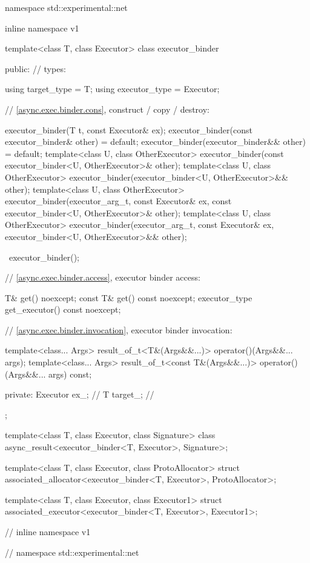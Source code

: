 \begin{codeblock}
namespace std::experimental::net {
inline namespace v1 {

  template<class T, class Executor>
  class executor_binder
  {
  public:
    // types:

    using target_type = T;
    using executor_type = Executor;

    // \ref{async.exec.binder.cons}, construct / copy / destroy:

    executor_binder(T t, const Executor& ex);
    executor_binder(const executor_binder& other) = default;
    executor_binder(executor_binder&& other) = default;
    template<class U, class OtherExecutor>
      executor_binder(const executor_binder<U, OtherExecutor>& other);
    template<class U, class OtherExecutor>
      executor_binder(executor_binder<U, OtherExecutor>&& other);
    template<class U, class OtherExecutor>
      executor_binder(executor_arg_t, const Executor& ex,
        const executor_binder<U, OtherExecutor>& other);
    template<class U, class OtherExecutor>
      executor_binder(executor_arg_t, const Executor& ex,
        executor_binder<U, OtherExecutor>&& other);

    ~executor_binder();

    // \ref{async.exec.binder.access}, executor binder access:

    T& get() noexcept;
    const T& get() const noexcept;
    executor_type get_executor() const noexcept;

    // \ref{async.exec.binder.invocation}, executor binder invocation:

    template<class... Args>
      result_of_t<T&(Args&&...)> operator()(Args&&... args);
    template<class... Args>
      result_of_t<const T&(Args&&...)> operator()(Args&&... args) const;

  private:
    Executor ex_; // \expos
    T target_; // \expos
  };

  template<class T, class Executor, class Signature>
    class async_result<executor_binder<T, Executor>, Signature>;

  template<class T, class Executor, class ProtoAllocator>
    struct associated_allocator<executor_binder<T, Executor>, ProtoAllocator>;

  template<class T, class Executor, class Executor1>
    struct associated_executor<executor_binder<T, Executor>, Executor1>;

} // inline namespace v1
} // namespace std::experimental::net
\end{codeblock}


